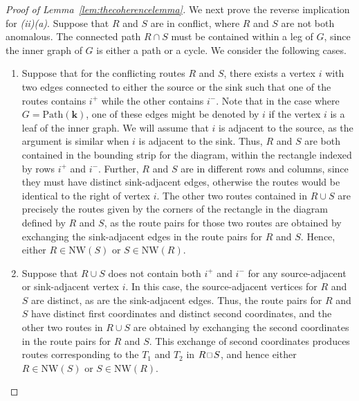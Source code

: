 \documentclass[10pt,a4paper]{amsart}
\newcommand\NW{\mathrm{NW}}
\newcommand\Path{\mathrm{Path}}
\newcommand\bk{\mathbf{k}}
\newcommand\squarette{\scalebox{0.75}{\hbox{$\,\square\,$}}}
\begin{document}
\begin{proof}[Proof of Lemma~\ref{lem:thecoherencelemma}]
We next prove the reverse implication for \textit{(ii)(a)}.
Suppose that $R$ and $S$ are in conflict, where $R$ and $S$ are not both anomalous.
The connected path $R\cap S$ must be contained within a leg of $G$, since the inner graph of $G$ is either a path or a cycle.
We consider the following cases.
\begin{enumerate}
    \item Suppose that for the conflicting routes $R$ and $S$, there exists a vertex $i$ with two edges connected to either the source or the sink such that one of the routes contains $i^+$ while the other contains $i^-$.
    Note that in the case where $G=\Path(\bk)$, one of these edges might be denoted by $i$ if the vertex $i$ is a leaf of the inner graph.
    We will assume that $i$ is adjacent to the source, as the argument is similar when $i$ is adjacent to the sink.
    Thus, $R$ and $S$ are both contained in the bounding strip for the diagram, within the rectangle indexed by rows $i^+$ and $i^-$.
    Further, $R$ and $S$ are in different rows and columns, since they must have distinct sink-adjacent edges, otherwise the routes would be identical to the right of vertex $i$.
    The other two routes contained in $R\cup S$ are precisely the routes given by the corners of the rectangle in the diagram defined by $R$ and $S$, as the route pairs for those two routes are obtained by exchanging the sink-adjacent edges in the route pairs for $R$ and $S$.
    Hence, either $R\in \NW(S)$ or $S\in \NW(R)$.
    \item Suppose that $R\cup S$ does not contain both $i^+$ and $i^-$ for any source-adjacent or sink-adjacent vertex $i$.
    In this case, the source-adjacent vertices for $R$ and $S$ are distinct, as are the sink-adjacent edges.
    Thus, the route pairs for $R$ and $S$ have distinct first coordinates and distinct second coordinates, and the other two routes in $R\cup S$ are obtained by exchanging the second coordinates in the route pairs for $R$ and $S$.
    This exchange of second coordinates produces routes corresponding to the $T_1$ and $T_2$ in $R\squarette S$, and hence either $R\in \NW(S)$ or $S\in \NW(R)$.
\end{enumerate}


\end{proof}
\end{document}
